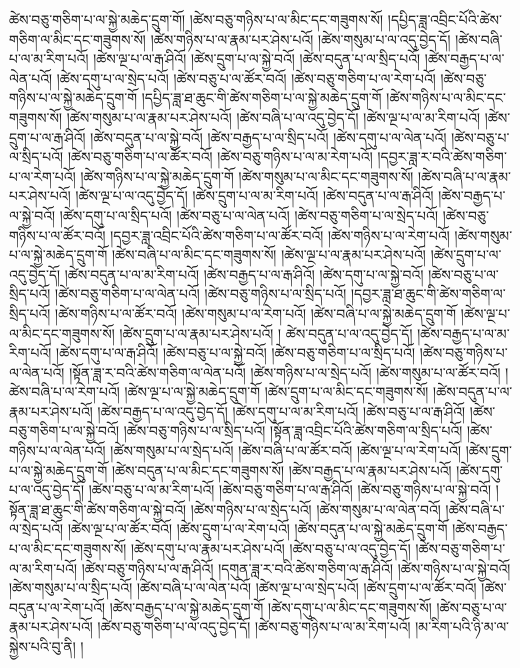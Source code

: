ཚེས་བཅུ་གཅིག་པ་ལ་སྐྱེ་མཆེད་དྲུག་གོ། །ཚེས་བཅུ་གཉིས་པ་ལ་མིང་དང་གཟུགས་སོ། །དཔྱིད་ཟླ་འབྲིང་པོའི་ཚེས་གཅིག་ལ་མིང་དང་གཟུགས་སོ། །ཚེས་གཉིས་པ་ལ་རྣམ་པར་ཤེས་པའོ། །ཚེས་གསུམ་པ་ལ་འདུ་བྱེད་དོ། །ཚེས་བཞི་པ་ལ་མ་རིག་པའོ། །ཚེས་ལྔ་པ་ལ་རྒ་ཤིའོ། །ཚེས་དྲུག་པ་ལ་སྐྱེ་བའོ། །ཚེས་བདུན་པ་ལ་སྲིད་པའོ། །ཚེས་བརྒྱད་པ་ལ་ལེན་པའོ། །ཚེས་དགུ་པ་ལ་སྲེད་པའོ། །ཚེས་བཅུ་པ་ལ་ཚོར་བའོ། །ཚེས་བཅུ་གཅིག་པ་ལ་རེག་པའོ། །ཚེས་བཅུ་གཉིས་པ་ལ་སྐྱེ་མཆེད་དྲུག་གོ །དཔྱིད་ཟླ་ཐ་ཆུང་གི་ཚེས་གཅིག་པ་ལ་སྐྱེ་མཆེད་དྲུག་གོ །ཚེས་གཉིས་པ་ལ་མིང་དང་གཟུགས་སོ། །ཚེས་གསུམ་པ་ལ་རྣམ་པར་ཤེས་པའོ། །ཚེས་བཞི་པ་ལ་འདུ་བྱེད་དོ། །ཚེས་ལྔ་པ་ལ་མ་རིག་པའོ། །ཚེས་དྲུག་པ་ལ་རྒ་ཤིའོ། །ཚེས་བདུན་པ་ལ་སྐྱེ་བའོ། །ཚེས་བརྒྱད་པ་ལ་སྲིད་པའོ། །ཚེས་དགུ་པ་ལ་ལེན་པའོ། །ཚེས་བཅུ་པ་ལ་སྲིད་པའོ། །ཚེས་བཅུ་གཅིག་པ་ལ་ཚོར་བའོ། །ཚེས་བཅུ་གཉིས་པ་ལ་མ་རེག་པའོ། །དབྱར་ཟླ་ར་བའི་ཚེས་གཅིག་པ་ལ་རེག་པའོ། །ཚེས་གཉིས་པ་ལ་སྐྱེ་མཆེད་དྲུག་གོ །ཚེས་གསུམ་པ་ལ་མིང་དང་གཟུགས་སོ། །ཚེས་བཞི་པ་ལ་རྣམ་པར་ཤེས་པའོ། །ཚེས་ལྔ་པ་ལ་འདུ་བྱེད་དོ། །ཚེས་དྲུག་པ་ལ་མ་རིག་པའོ། །ཚེས་བདུན་པ་ལ་རྒ་ཤིའོ། །ཚེས་བརྒྱད་པ་ལ་སྐྱེ་བའོ། །ཚེས་དགུ་པ་ལ་སྲིད་པའོ། །ཚེས་བཅུ་པ་ལ་ལེན་པའོ། །ཚེས་བཅུ་གཅིག་པ་ལ་སྲེད་པའོ། །ཚེས་བཅུ་གཉིས་པ་ལ་ཚོར་བའོ། །དབྱར་ཟླ་འབྲིང་པོའི་ཚེས་གཅིག་པ་ལ་ཚོར་བའོ། །ཚེས་གཉིས་པ་ལ་རེག་པའོ། །ཚེས་གསུམ་པ་ལ་སྐྱེ་མཆེད་དྲུག་གོ །ཚེས་བཞི་པ་ལ་མིང་དང་གཟུགས་སོ། །ཚེས་ལྔ་པ་ལ་རྣམ་པར་ཤེས་པའོ། །ཚེས་དྲུག་པ་ལ་འདུ་བྱེད་དོ། །ཚེས་བདུན་པ་ལ་མ་རིག་པའོ། །ཚེས་བརྒྱད་པ་ལ་རྒ་ཤིའོ། །ཚེས་དགུ་པ་ལ་སྐྱེ་བའོ། །ཚེས་བཅུ་པ་ལ་སྲིད་པའོ། །ཚེས་བཅུ་གཅིག་པ་ལ་ལེན་པའོ། །ཚེས་བཅུ་གཉིས་པ་ལ་སྲིད་པའོ། །དབྱར་ཟླ་ཐ་ཆུང་གི་ཚེས་གཅིག་ལ་སྲིད་པའོ། །ཚེས་གཉིས་པ་ལ་ཚོར་བའོ། །ཚེས་གསུམ་པ་ལ་རེག་པའོ། །ཚེས་བཞི་པ་ལ་སྐྱེ་མཆེད་དྲུག་གོ །ཚེས་ལྔ་པ་ལ་མིང་དང་གཟུགས་སོ། །ཚེས་དྲུག་པ་ལ་རྣམ་པར་ཤེས་པའོ། །
ཚེས་བདུན་པ་ལ་འདུ་བྱེད་དོ། །ཚེས་བརྒྱད་པ་ལ་མ་རིག་པའོ། །ཚེས་དགུ་པ་ལ་རྒ་ཤིའོ། །ཚེས་བཅུ་པ་ལ་སྐྱེ་བའོ། །ཚེས་བཅུ་གཅིག་པ་ལ་སྲིད་པའོ། །ཚེས་བཅུ་གཉིས་པ་ལ་ལེན་པའོ། །སྟོན་ཟླ་ར་བའི་ཚེས་གཅིག་ལ་ལེན་པའོ། །ཚེས་གཉིས་པ་ལ་སྲེད་པའོ། །ཚེས་གསུམ་པ་ལ་ཚོར་བའོ། །ཚེས་བཞི་པ་ལ་རེག་པའོ། །ཚེས་ལྔ་པ་ལ་སྐྱེ་མཆེད་དྲུག་གོ །ཚེས་དྲུག་པ་ལ་མིང་དང་གཟུགས་སོ། །ཚེས་བདུན་པ་ལ་རྣམ་པར་ཤེས་པའོ། །ཚེས་བརྒྱད་པ་ལ་འདུ་བྱེད་དོ། །ཚེས་དགུ་པ་ལ་མ་རིག་པའོ། །ཚེས་བཅུ་པ་ལ་རྒ་ཤིའོ། །ཚེས་བཅུ་གཅིག་པ་ལ་སྐྱེ་བའོ། །ཚེས་བཅུ་གཉིས་པ་ལ་སྲིད་པའོ། །སྟོན་ཟླ་འབྲིང་པོའི་ཚེས་གཅིག་ལ་སྲིད་པའོ། །ཚེས་གཉིས་པ་ལ་ལེན་པའོ། །ཚེས་གསུམ་པ་ལ་སྲེད་པའོ། །ཚེས་བཞི་པ་ལ་ཚོར་བའོ། །ཚེས་ལྔ་པ་ལ་རེག་པའོ། །ཚེས་དྲུག་པ་ལ་སྐྱེ་མཆེད་དྲུག་གོ །ཚེས་བདུན་པ་ལ་མིང་དང་གཟུགས་སོ། །ཚེས་བརྒྱད་པ་ལ་རྣམ་པར་ཤེས་པའོ། །ཚེས་དགུ་པ་ལ་འདུ་བྱེད་དོ། །ཚེས་བཅུ་པ་ལ་མ་རིག་པའོ། །ཚེས་བཅུ་གཅིག་པ་ལ་རྒ་ཤིའོ། །ཚེས་བཅུ་གཉིས་པ་ལ་སྐྱེ་བའོ། །སྟོན་ཟླ་ཐ་ཆུང་གི་ཚེས་གཅིག་ལ་སྐྱེ་བའོ། །ཚེས་གཉིས་པ་ལ་སྲེད་པའོ། །ཚེས་གསུམ་པ་ལ་ལེན་བའོ། །ཚེས་བཞི་པ་ལ་སྲེད་པའོ། །ཚེས་ལྔ་པ་ལ་ཚོར་བའོ། །ཚེས་དྲུག་པ་ལ་རེག་པའོ། །ཚེས་བདུན་པ་ལ་སྐྱེ་མཆེད་དྲུག་གོ །ཚེས་བརྒྱད་པ་ལ་མིང་དང་གཟུགས་སོ། །ཚེས་དགུ་པ་ལ་རྣམ་པར་ཤེས་པའོ། །ཚེས་བཅུ་པ་ལ་འདུ་བྱེད་དོ། །ཚེས་བཅུ་གཅིག་པ་ལ་མ་རིག་པའོ། །ཚེས་བཅུ་གཉིས་པ་ལ་རྒ་ཤིའོ། །དགུན་ཟླ་ར་བའི་ཚེས་གཅིག་ལ་རྒ་ཤིའོ། །ཚེས་གཉིས་པ་ལ་སྐྱེ་བའོ། །ཚེས་གསུམ་པ་ལ་སྲིད་པའོ། །ཚེས་བཞི་པ་ལ་ལེན་པའོ། །ཚེས་ལྔ་པ་ལ་སྲེད་པའོ། །ཚེས་དྲུག་པ་ལ་ཚོར་བའོ། །ཚེས་བདུན་པ་ལ་རེག་པའོ། །ཚེས་བརྒྱད་པ་ལ་སྐྱེ་མཆེད་དྲུག་གོ །ཚེས་དགུ་པ་ལ་མིང་དང་གཟུགས་སོ། །ཚེས་བཅུ་པ་ལ་རྣམ་པར་ཤེས་པའོ། །ཚེས་བཅུ་གཅིག་པ་ལ་འདུ་བྱེད་དོ། །ཚེས་བཅུ་གཉིས་པ་ལ་མ་རིག་པའོ། །མ་རིག་པའི་ཉི་མ་ལ་སྐྱེས་པའི་བུ་ནི། །

